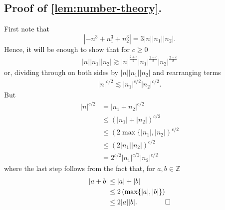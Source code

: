 \documentclass[12pt,reqno]{amsart}
\numberwithin{equation}{section}  %
\numberwithin{figure}{section}
\newcommand{\zz}{\mathbb{Z}}
\theoremstyle{plain}
\theoremstyle{definition}
\theoremstyle{remark}
\begin{document}
\subsection{Proof of \autoref{lem:number-theory}.} First note that
%
\begin{equation*}
		| - n^{3} + n_1^3 + n_2^3|
		 = 3 | n | |n_1 | |n_2 |.
\end{equation*}
%
%
Hence, it will be enough to show that for $c \ge 0$
%
%
\begin{equation*}
	\begin{split}
		| n | |n_1 | |n_2 | \gtrsim | n |^{\frac{2 + c}{2}}| n_1
		|^{\frac{2-c}{2}}| n_2 |^{\frac{2-c}{2}}
	\end{split}
\end{equation*}
%
%
or, dividing through on both sides by $|n| | n_1 | | n_2 |$ and rearranging terms
%
%
\begin{equation*}
	\begin{split}
		| n |^{c/2} \lesssim | n_1 |^{c/2} | n_2 |^{c/2}.
	\end{split}
\end{equation*}
%
%
But
%
%
\begin{equation*}
	\begin{split}
		| n |^{c/2} &= | n_1 + n_2 |^{c/2}
		\\
		& \le (| n_1 | + |n_2|)^{c/2} 
		\\
		& \le (2\max\{|
		n_1 |, | n_2 |)^{c/2}
		\\
		& \le (2|
		n_1 | | n_2 |)^{c/2}
		\\
		& = 2^{c/2} | n_1 |^{c/2} | n_2 |^{c/2}
	\end{split}
\end{equation*}
%
%
where the last step follows from the fact that, for $a, b \in \zz$ 
%
\begin{equation}
	\label{6a}
	\begin{split}
		| a + b | 
		& \le | a | + | b | 
		\\
		& \le 2\left( \max\{| a |, | b | \}\right)
		\\
		& \le 2 |a| |b|. \qquad \qed
	\end{split}
\end{equation} 
\end{document}
